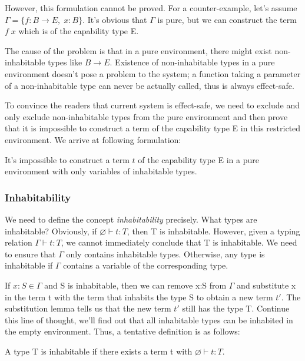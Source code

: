 However, this formulation cannot be proved.  For a counter-example,
let's assume $\Gamma = \{f: B \to E, \; x: B\}$. It's obvious that
$\Gamma$ is pure, but we can construct the term $f \; x$ which is of
the capability type E.

The cause of the problem is that in a pure environment, there might
exist non-inhabitable types like $B \to E$.  Existence of
non-inhabitable types in a pure environment doesn't pose a problem to
the system; a function taking a parameter of a non-inhabitable type can
never be actually called, thus is always effect-safe.

To convince the readers that current system is effect-safe, we need to
exclude and only exclude non-inhabitable types from the pure
environment and then prove that it is impossible to construct a term
of the capability type E in this restricted environment. We arrive at
following formulation:

\begin{definition}
  It's impossible to construct a term $t$ of the capability type E in
  a pure environment with only variables of inhabitable types.
\end{definition}

\subsubsection{Inhabitability}

We need to define the concept \emph{inhabitability} precisely. What
types are inhabitable? Obviously, if $\varnothing \vdash t: T$, then T
is inhabitable.  However, given a typing relation
$\Gamma \vdash t: T$, we cannot immediately conclude that T is
inhabitable. We need to ensure that $\Gamma$ only contains inhabitable
types. Otherwise, any type is inhabitable if $\Gamma$ contains a
variable of the corresponding type.

If $x:S \in \Gamma$ and S is inhabitable, then we can remove x:S from
$\Gamma$ and substitute x in the term t with the term that inhabits
the type S to obtain a new term $t'$. The substitution lemma tells us
that the new term $t'$ still has the type T. Continue this line of
thought, we'll find out that all inhabitable types can be inhabited in
the empty environment. Thus, a tentative definition is as follows:

\begin{definition}
  A type T is inhabitable if there exists a term t with $\varnothing
  \vdash t : T$.
\end{definition}

